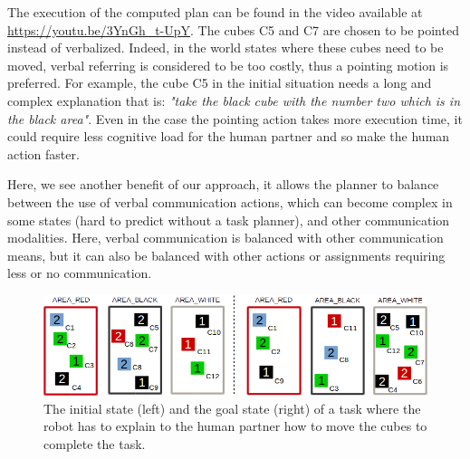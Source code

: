 \documentclass[a4paper,11pt,twoside]{StyleThese}
\begin{document}
The execution of the computed plan can be found in the video available at \url{https://youtu.be/3YnGh\_t-UpY}. The cubes C5 and C7 are chosen to be pointed instead of verbalized. Indeed, in the world states where these cubes need to be moved, verbal referring is considered to be too costly, thus a pointing motion is preferred. For example, the cube C5 in the initial situation needs a long and complex explanation that is: \textit{"take the black cube with the number two which is in the black area"}. Even in the case the pointing action takes more execution time, it could require less cognitive load for the human partner and so make the human action faster.

Here, we see another benefit of our approach, it allows the planner to balance between the use of verbal communication actions, which can become complex in some states (hard to predict without a task planner), and other communication modalities. %
Here, verbal communication is balanced with other communication means, but it can also be balanced with other actions or assignments requiring less or no communication.

\begin{figure}[t!]
\centering
\includegraphics[scale=0.5]{figures/chapter3/case3.png}
\caption{\label{fig:case3} The initial state (left) and the goal state (right) of a task where the robot has to explain to the human partner how to move the cubes to complete the task. }
\end{figure}



\end{document}
